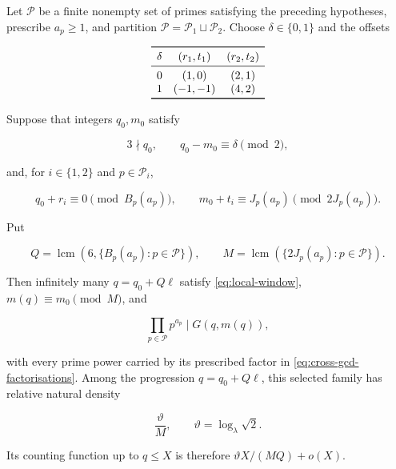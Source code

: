 \begin{proposition}
\label{prop:local-transfer}
Let $\mathcal P$ be a finite nonempty set of primes satisfying the preceding
hypotheses, prescribe $a_p\geqslant1$, and partition
$\mathcal P=\mathcal P_1\sqcup\mathcal P_2$. Choose
$\delta\in\{0,1\}$ and the offsets

\begin{equation}
\begin{array}{ccc}
 \toprule
 \delta&(r_1,t_1)&(r_2,t_2)\\
 \midrule
 0&(1,0)&(2,1)\\
 1&(-1,-1)&(4,2)\\
 \bottomrule
\end{array}
\label{eq:clock-offsets}
\end{equation}

Suppose that integers $q_0,m_0$ satisfy

\begin{equation}
 3\nmid q_0,
 \qquad
 q_0-m_0\equiv\delta\pmod2,
 \label{eq:clock-phase}
\end{equation}

and, for $i\in\{1,2\}$ and $p\in\mathcal P_i$,

\begin{equation}
 q_0+r_i\equiv0\pmod {B_p(a_p)},
 \qquad
 m_0+t_i\equiv J_p(a_p)\pmod {2J_p(a_p)}.
 \label{eq:clock-congruences}
\end{equation}

Put

\begin{equation}
 Q=\operatorname{lcm}\left(6,\{B_p(a_p):p\in\mathcal P\}\right),
 \qquad
 M=\operatorname{lcm}\left(\{2J_p(a_p):p\in\mathcal P\}\right).
 \label{eq:clock-moduli}
\end{equation}

Then infinitely many $q=q_0+Q\ell$ satisfy
\cref{eq:local-window}, $m(q)\equiv m_0\pmod M$, and

\begin{equation}
 \prod_{p\in\mathcal P}p^{a_p}\mid G(q,m(q)),
 \label{eq:clock-product}
\end{equation}

with every prime power carried by its prescribed factor in
\cref{eq:cross-gcd-factorisations}. Among the progression
$q=q_0+Q\ell$, this selected family has relative natural density

\begin{equation}
 \frac{\vartheta}{M},
 \qquad
 \vartheta=\log_\lambda\sqrt2.
 \label{eq:clock-relative-density}
\end{equation}

Its counting function up to $q\leqslant X$ is therefore
$\vartheta X/(MQ)+o(X)$.
\end{proposition}

